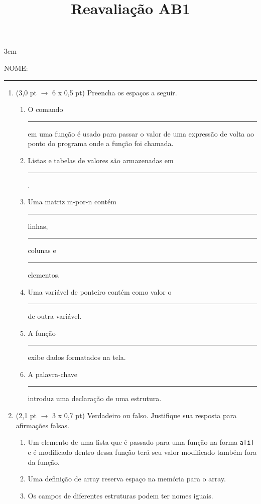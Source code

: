 \documentclass[a4paper,10pt]{article}
\title{Reavaliação AB1}
\begin{document}
\maketitle

\emergencystretch 3em



NOME: \rule{.85\textwidth}{0.1mm}

\begin{multicols*}{2}
\setlength{\leftmargini}{0pt}
\begin{enumerate}
  \item (3,0 pt $\rightarrow$ 6 x 0,5 pt) Preencha os espaços a seguir.

  \begin{enumerate}
    \item O comando \rule{1cm}{0.2mm} em uma função é usado para passar o valor de uma expressão de volta ao ponto do programa onde a função foi chamada. %
    \item Listas e tabelas de valores são armazenadas em \rule{1cm}{0.2mm}. %
    \item Uma matriz m-por-n contém \rule{1cm}{0.2mm} linhas, \rule{1cm}{0.2mm} colunas e \rule{1cm}{0.2mm} elementos. %
    \item Uma variável de ponteiro contém como valor o \rule{1cm}{0.2mm} de outra variável. %
    \item A função \rule{1cm}{0.2mm} exibe dados formatados na tela. %
    \item A palavra-chave \rule{1cm}{0.2mm} introduz uma declaração de uma estrutura. %
  \end{enumerate}

  \item (2,1 pt $\rightarrow$ 3 x 0,7 pt) Verdadeiro ou falso. Justifique sua resposta para afirmações falsas.

  \begin{enumerate}
    \item Um elemento de uma lista que é passado para uma função na forma \texttt{a[i]} e é modificado dentro dessa função terá seu valor modificado também fora da função. %
    \item Uma definição de array reserva espaço na memória para o array. %
    \item Os campos de diferentes estruturas podem ter nomes iguais. %
  \end{enumerate}


\end{enumerate}
\end{multicols*}
\end{document}

